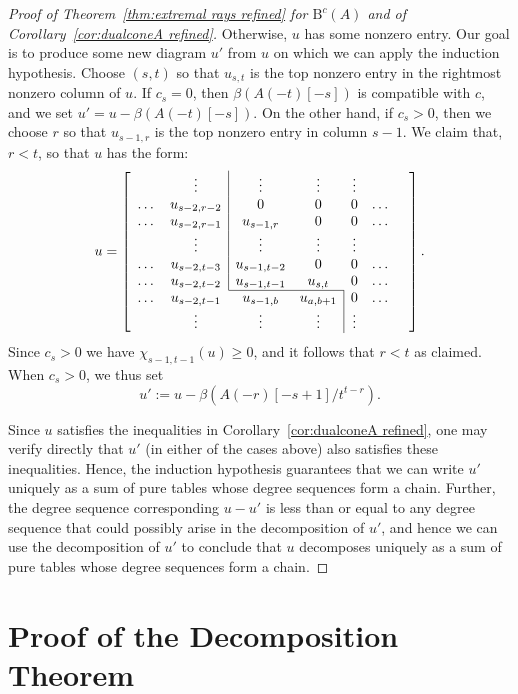 \documentclass[12pt]{amsart}
\theoremstyle{definition}
\theoremstyle{remark}
\newcommand{\cc}{c}
\newcommand{\BBQ}{\mathrm{B}}
\begin{document}
\begin{proof}[Proof of Theorem~\ref{thm:extremal rays refined} for $\BBQ^{\cc}(A)$ and of Corollary~\ref{cor:dualconeA refined}]
Otherwise, $u$ has some nonzero entry.  Our goal is to produce some new diagram $u'$ from $u$ on which we can apply the induction hypothesis.  Choose $(s,t)$ so that $u_{s,t}$ is the top nonzero entry in the rightmost nonzero column of $u$.
If $c_s=0$, then $\beta(A(-t)[-s])$ is compatible with $\cc$, and we set $u'=u-\beta(A(-t)[-s])$.  On the other hand, if $c_s>0$, then we choose $r$ so that $u_{s-1,r}$ is the top nonzero entry in column $s-1$.  We claim that, $r<t$, so that $u$ has the form:
\[
u=
\left[
\begin{array}{ccccccc}
 & \vdots& \multicolumn{1}{|c}{\vdots}&\vdots& \vdots&&\\
\dots&u_{s-2,r-2}&\multicolumn{1}{|c}{0}&0&0&\dots\\
\dots&u_{s-2,r-1}&\multicolumn{1}{|c}{u_{s-1,r}}&0&0&\dots\\
 & \vdots& \multicolumn{1}{|c}{\vdots}&\vdots& \vdots&&\\
\dots&u_{s-2,t-3}&\multicolumn{1}{|c}{u_{s-1,t-2}}&0&0&\dots\\
\dots&u_{s-2,t-2}&\multicolumn{1}{|c}{u_{s-1,t-1}}&u_{s,t}&0&\dots\\ \cline{3-4}
\dots&u_{s-2,t-1}&u_{s-1,b}&u_{a,b+1}&\multicolumn{1}{|c}{0}&\dots\\
& \vdots&\vdots&\vdots& \multicolumn{1}{|c}{\vdots}&&\\
\end{array}\right].
\]
Since $c_s>0$ we have $\chi_{s-1,t-1}(u)\geq 0$, and it follows that $r<t$ as claimed.  When $c_s>0$, we thus set
\[
u':=u-\beta(A(-r)[-s+1]/t^{t-r}).
\]

Since $u$ satisfies the inequalities in Corollary~\ref{cor:dualconeA refined}, one may verify directly that $u'$ (in either of the cases above) also satisfies these inequalities.  Hence, the induction hypothesis guarantees that we can write $u'$ uniquely as a sum of pure tables whose degree sequences form a chain.  Further, the degree sequence corresponding $u-u'$ is less than or equal to any degree sequence that could possibly arise in the decomposition of $u'$, and hence we can use the decomposition of $u'$ to conclude that $u$ decomposes uniquely as a sum of pure tables whose degree sequences form a chain.
\end{proof}




\section{Proof of the Decomposition Theorem}\label{sec:refined proof}\label{sec:general case}
\end{document}
